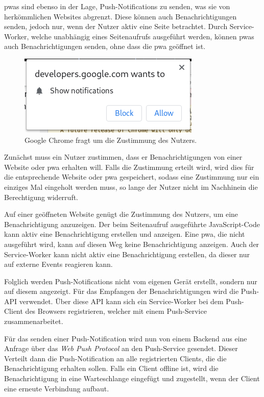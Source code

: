 \documentclass[12pt, parskip=half]{scrartcl}       %
\begin{document}
\acp{pwa} sind ebenso in der Lage, Push-Notifications zu senden, was sie von herkömmlichen Websites abgrenzt.
Diese können auch Benachrichtigungen senden, jedoch nur, wenn der Nutzer aktiv eine Seite betrachtet.
Durch Service-Worker, welche unabhängig eines Seitenaufrufs ausgeführt werden, können \acp{pwa} auch Benachrichtigungen senden, ohne dass die \ac{pwa} geöffnet ist\cite{ejaz_progressive_pushnotifications}.

\begin{figure}[h]
  \centering
  \includegraphics[width=0.4\linewidth]{src/permission-request-chrome.png}
  \caption{Google Chrome fragt um die Zustimmung des Nutzers.}
  \label{fig:chrome_permission}
\end{figure}

Zunächst muss ein Nutzer zustimmen, dass er Benachrichtigungen von einer Website oder \ac{pwa} erhalten will.
Falls die Zustimmung erteilt wird, wird dies für die entsprechende Website oder \ac{pwa} gespeichert, sodass eine Zustimmung nur ein einziges Mal eingeholt werden muss, so lange der Nutzer nicht im Nachhinein die Berechtigung widerruft.

Auf einer geöffneten Website genügt die Zustimmung des Nutzers, um eine Benachrichtigung anzuzeigen.
Der beim Seitenaufruf ausgeführte JavaScript-Code kann aktiv eine Benachrichtigung erstellen und anzeigen.
Eine \ac{pwa}, die nicht ausgeführt wird, kann auf diesen Weg keine Benachrichtigung anzeigen.
Auch der Service-Worker kann nicht aktiv eine Benachrichtigung erstellen, da dieser nur auf externe Events reagieren kann.

Folglich werden Push-Notifications nicht vom eigenen Gerät erstellt, sondern nur auf diesem angezeigt.
Für das Empfangen der Benachrichtigungen wird die Push-API\cite{w3c_pushapi} verwendet.
Über diese API kann sich ein Service-Worker bei dem Push-Client des Browsers registrieren, welcher mit einem Push-Service zusammenarbeitet.



Für das senden einer Push-Notification wird nun von einem Backend aus eine Anfrage über das \textit{Web Push Protocol}\cite{ietf_webpush} an den Push-Service gesendet.
Dieser Verteilt dann die Push-Notification an alle registrierten Clients, die die Benachrichtigung erhalten sollen.
Falls ein Client offline ist, wird die Benachrichtigung in eine Warteschlange eingefügt und zugestellt, wenn der Client eine erneute Verbindung aufbaut.\cite{googledev_webpush}
\end{document}
